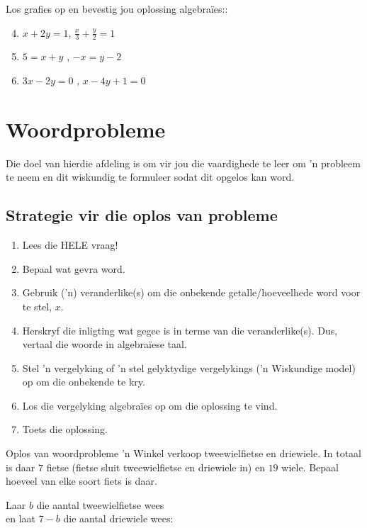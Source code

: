 \begin{aktiwiteit}{}
\begin{exercises}{}
{Los grafies op en bevestig jou oplossing algebraïes::

\begin{enumerate}[noitemsep, label=\textbf{\arabic*}. ] 
\setcounter{enumi}{3}
\item  $x+2y=1$, $\frac{x}{3} + \frac{y}{2} = 1$
\item $5= x+y$ , $-x = y-2$
\item $3x - 2y = 0$ , $x - 4y + 1 = 0$

\end{enumerate}

}
\end{exercises}

\section{Woordprobleme}


Die doel van hierdie afdeling is om vir jou die vaardighede te leer om ’n probleem te neem en dit wiskundig te
formuleer sodat dit opgelos kan word.


\subsection*{Strategie vir die oplos van probleme}

\begin{enumerate}[noitemsep, label=\textbf{\arabic*}. ] 
\item Lees die HELE vraag!
\item Bepaal wat gevra word.
\item Gebruik (’n) veranderlike(s) om die onbekende getalle/hoeveelhede word voor te stel, $x$.
\item  Herskryf die inligting wat gegee is in terme van die veranderlike(s). Dus, vertaal die woorde in algebraïese
taal.
\item Stel ’n vergelyking of ’n stel gelyktydige vergelykings (’n Wiskundige model) op om die onbekende te kry.
\item Los die vergelyking algebraïes op om die oplossing te vind.
\item Toets die oplossing.
\end{enumerate}


\begin{wex}
{Oplos van woordprobleme}
{
 ’n Winkel verkoop tweewielfietse en driewiele. In totaal is daar $7$ fietse (fietse sluit tweewielfietse en driewiele in) en $19$ wiele. Bepaal hoeveel van elke soort fiets is daar.
}
{
Laar $b$ die aantal tweewielfietse wees  \\
en laat $7-b$  die aantal driewiele wees: 

}
\end{wex}
\end{aktiwiteit}
